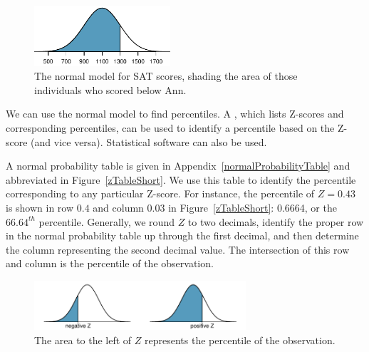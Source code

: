 \begin{figure}[htb]
   \centering
   \includegraphics[width=0.45\textwidth]{ch_distributions/figures/satBelow1300/satBelow1300}
   \caption{The normal model for SAT scores, shading the area of those individuals who scored below Ann.}
   \label{satBelow1300}
\end{figure}

We can use the normal model to find percentiles. A , which lists Z-scores and corresponding percentiles, can be used to identify a percentile based on the Z-score (and vice versa). Statistical software can also be used.

\D{\newpage}

A normal probability table is given in Appendix~\vref{normalProbabilityTable} and abbreviated in Figure~\ref{zTableShort}. We use this table to identify the percentile corresponding to any particular Z-score. For instance, the percentile of $Z=0.43$ is shown in row $0.4$ and column $0.03$ in Figure~\ref{zTableShort}: 0.6664, or the $66.64^{th}$ percentile. Generally, we round $Z$ to two decimals, identify the proper row in the normal probability table up through the first decimal, and then determine the column representing the second decimal value. The intersection of this row and column is the percentile of the observation.

\begin{figure}[h]
\centering
\includegraphics[width=0.7\textwidth]{ch_distributions/figures/normalTails/normalTails}
\caption{The area to the left of $Z$ represents the percentile of the observation.}
\label{normalTails}
\end{figure}

